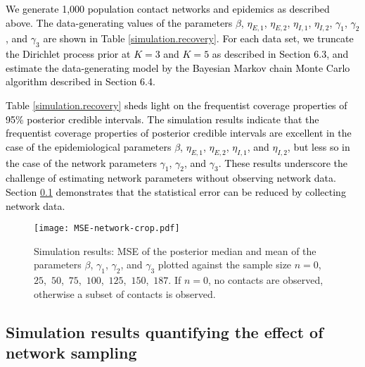 \documentclass[12pt,usenatbib,referee]{article}
\renewcommand{\alert}{\textcolor{black}}
\begin{document}
\alert{We generate 1,000 population contact networks and epidemics as described above.
The data-generating values of the parameters $\beta$, $\eta_{E,1}$, $\eta_{E,2}$, $\eta_{I,1}$, $\eta_{I,2}$, $\gamma_1$, $\gamma_2$, and $\gamma_3$ are shown in Table \ref{simulation.recovery}.
For each data set,
we truncate the Dirichlet process prior at $K = 3$ and $K = 5$ as described in Section 6.3,
and estimate the data-generating model by the Bayesian Markov chain Monte Carlo algorithm described in Section 6.4.}

\alert{Table \ref{simulation.recovery} sheds light on the frequentist coverage properties of 95\% posterior credible intervals.
The simulation results indicate that the frequentist coverage properties of posterior credible intervals are excellent in the case of the epidemiological parameters $\beta$, $\eta_{E,1}$, $\eta_{E,2}$, $\eta_{I,1}$, and $\eta_{I,2}$,
but less so in the case of the network parameters $\gamma_1$, $\gamma_2$, and $\gamma_3$.
These results underscore the challenge of estimating network parameters without observing network data.
Section \ref{sim.sampling} demonstrates that the statistical error can be reduced by collecting network data.}

\begin{figure}[t]
\caption{\label{mse.plot}{Simulation results: MSE of the posterior median and mean of the parameters $\beta$, $\gamma_1$, $\gamma_2$, and $\gamma_3$ plotted against the sample size $n = 0$,\, $25$,\, $50$,\, $75$,\, $100$,\, $125$,\, $150$,\, $187$.\break
If $n=0$, 
no contacts are observed,
otherwise a subset of contacts is observed.}}
\begin{center}
\texttt{[image: MSE-network-crop.pdf]}
\end{center}
\end{figure}

\subsection{Simulation results quantifying the effect of network sampling}
\label{sim.sampling}

\alert{}
\end{document}
